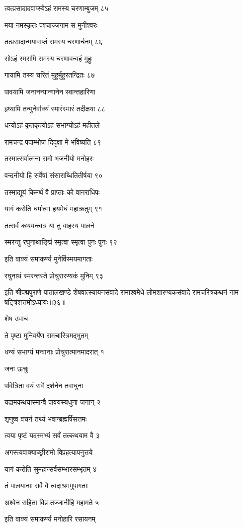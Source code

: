 त्वत्प्रसादादवाप्स्येऽहं रामस्य चरणाम्बुजम् ८५

मया नमस्कृतः पश्चाज्जगाम स मुनीश्वरः

तत्प्रसादान्मयावाप्तं रामस्य चरणार्चनम् ८६

सोऽहं स्मरामि रामस्य चरणावन्वहं मुहुः

गायामि तस्य चरितं मुहुर्मुहुरतन्द्रितः ८७

पावयामि जनानन्यान्गानेन स्वान्तहारिणा

हृष्यामि तन्मुनेर्वाक्यं स्मारंस्मारं तदीक्षया ८८

धन्योऽहं कृतकृत्योऽहं सभाग्योऽहं महीतले

रामचन्द्र पदाम्भोज दिदृक्षा मे भविष्यति ८९

तस्मात्सर्वात्मना रामो भजनीयो मनोहरः

वन्दनीयो हि सर्वेषां संसाराब्धितितीर्षया ९०

तस्माद्यूयं किमर्थं वै प्राप्ताः को वानराधिपः

यागं करोति धर्मात्मा हयमेधं महाक्रतुम् ९१

तत्सर्वं कथयन्त्वत्र यां तु वाहस्य पालने

स्मरन्तु रघुनाथाङ्घ्रिं स्मृत्वा स्मृत्वा पुनः पुनः ९२

इति वाक्यं समाकर्ण्य मुनेर्विस्मयमागताः

रघुनाथं स्मरन्तस्ते प्रोचुरारण्यकं मुनिम् ९३

इति श्रीपद्मपुराणे पातालखण्डे शेषवात्स्यायनसंवादे रामाश्वमेधे लोमशारण्यकसंवादे रामचरित्रकथनं नाम षट्त्रिंशत्तमोऽध्यायः॥३६॥


शेष उवाच

ते पृष्टा मुनिवर्येण रामचारित्रमद्भुतम्

धन्यं सभाग्यं मन्वानाः प्रोचुरात्मानमादरात् १

जना ऊचुः

पवित्रिता वयं सर्वे दर्शनेन तवाधुना

यद्रामकथयास्मान्वै पावयस्यधुना जनान् २

शृणुष्व वचनं तथ्यं भवान्ब्रह्मर्षिसत्तमः

त्वया पृष्टं यदस्मभ्यं सर्वं तत्कथयाम वै ३

अगस्त्यवाक्याच्छ्रीरामो विप्रहत्यापनुत्तये

यागं करोति सुमहान्सर्वसम्भारसम्भृतम् ४

तं पालयानाः सर्वे वै त्वदाश्रममुपागताः

अश्वेन सहिता विप्र तज्जानीहि महामते ५

इति वाक्यं समाकर्ण्य मनोहारि रसायनम्

